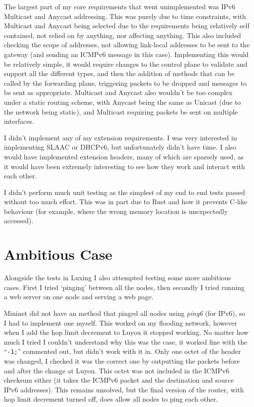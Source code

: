 \documentclass[12pt,a4paper,twoside,openright]{report}
\begin{document}
\bigskip

The largest part of my core requirements that went unimplemented was IPv6 Multicast and Anycast addressing.  This was purely due to time constraints, with Multicast and Anycast being selected due to the requirements being relatively self contained, not relied on by anything, nor affecting anything.  This also included checking the scope of addresses, not allowing link-local addresses to be sent to the gateway (and sending an ICMPv6 message in this case).  Implementing this would be relatively simple, it would require changes to the control plane to validate and support all the different types, and then the addition of methods that can be called by the forwarding plane, triggering packets to be dropped and messages to be sent as appropriate. Multicast and Anycast also wouldn't be too complex under a static routing scheme, with Anycast being the same as Unicast (due to the network being static), and Multicast requiring packets be sent on multiple interfaces.

\bigskip

I didn't implement any of my extension requirements.  I was very interested in implementing SLAAC or DHCPv6, but unfortunately didn't have time.  I also would have implemented extension headers, many of which are sparsely used, as it would have been extremely interesting to see how they work and interact with each other.

\bigskip

I didn't perform much unit testing as the simplest of my end to end tests passed without too much effort.  This was in part due to Rust and how it prevents C-like behaviour (for example, where the wrong memory location is unexpectedly accessed).

\section{Ambitious Case}

Alongside the tests in Luxing I also attempted testing some more ambitious cases.  First I tried `pinging' between all the nodes, then secondly I tried running a web server on one node and serving a web page.

\bigskip

Mininet did not have an method that pinged all nodes using \textit{ping6} (for IPv6), so I had to implement one myself.  This worked on my flooding network, however when I add the hop limit decrement to Luyou it stopped working. No matter how much I tried I couldn't understand why this was the case, it worked fine with the ``\verb!-1;!'' commented out, but didn't work with it in. Only one octet of the header was changed, I checked it was the correct one by outputting the packets before and after the change at Luyou.  This octet was not included in the ICMPv6 checksum either (it takes the ICMPv6 packet and the destination and source IPv6 addresses).  This remains unsolved, but the final version of the router, with hop limit decrement turned off, does allow all nodes to ping each other.
\end{document}
